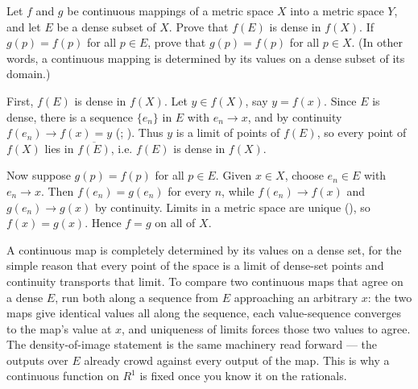 \documentclass[main.tex]{subfiles}
\begin{document}
Let $f$ and $g$ be continuous mappings of a metric space $X$ into a metric space $Y$, and let $E$ be a dense subset of $X$. Prove that $f(E)$ is dense in $f(X)$. If $g(p) = f(p)$ for all $p \in E$, prove that $g(p) = f(p)$ for all $p \in X$. (In other words, a continuous mapping is determined by its values on a dense subset of its domain.)
\begin{Solution}
First, $f(E)$ is dense in $f(X)$. Let $y \in f(X)$, say $y = f(x)$. Since $E$ is dense, there is a sequence $\{e_{n}\}$ in $E$ with $e_{n} \to x$, and by continuity $f(e_{n}) \to f(x) = y$ (; ). Thus $y$ is a limit of points of $f(E)$, so every point of $f(X)$ lies in $\overline{f(E)}$, i.e. $f(E)$ is dense in $f(X)$.

Now suppose $g(p) = f(p)$ for all $p \in E$. Given $x \in X$, choose $e_{n} \in E$ with $e_{n} \to x$. Then $f(e_{n}) = g(e_{n})$ for every $n$, while $f(e_{n}) \to f(x)$ and $g(e_{n}) \to g(x)$ by continuity. Limits in a metric space are unique (), so $f(x) = g(x)$. Hence $f = g$ on all of $X$.
\end{Solution}
\begin{Reflection}
A continuous map is completely determined by its values on a dense set, for the simple reason that every point of the space is a limit of dense-set points and continuity transports that limit. To compare two continuous maps that agree on a dense $E$, run both along a sequence from $E$ approaching an arbitrary $x$: the two maps give identical values all along the sequence, each value-sequence converges to the map's value at $x$, and uniqueness of limits forces those two values to agree. The density-of-image statement is the same machinery read forward --- the outputs over $E$ already crowd against every output of the map. This is why a continuous function on $R^{1}$ is fixed once you know it on the rationals.
\end{Reflection}
\end{document}
